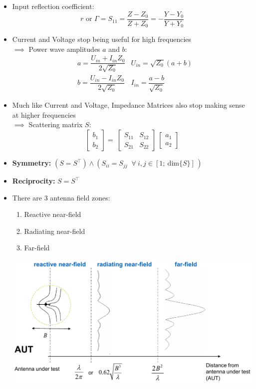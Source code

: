 \begin{itemize}
    \itemsep0pt
    \item Input reflection coefficient:\\
        \[r \text{ or } \Gamma = S_{11} = \dfrac{Z - Z_0}{Z + Z_0} = -\dfrac{Y - Y_0}{Y + Y_0}\]
    \item Current and Voltage stop being useful for high frequencies\\
        $\implies$ Power wave amplitudes $a$ and $b$:
    \begin{align*}
        &a = \dfrac{U_{in} + I_{in}Z_0}{2\sqrt{Z_0}} & U_{in} = \sqrt{Z_0} (a + b)\\
        &b = \dfrac{U_{in} - I_{in}Z_0}{2\sqrt{Z_0}} & I_{in} = \dfrac{a - b}{\sqrt{Z_0}}
    \end{align*}
    \item Much like Current and Voltage, Impedance Matrices also stop making sense at higher frequencies\\
    $\implies$ Scattering matrix $S$:
        \[\begin{bmatrix}b_1\\ b_2\end{bmatrix} =\
            \begin{bmatrix}S_{11} & S_{12}\\ S_{21} & S_{22}\end{bmatrix} \
            \begin{bmatrix}a_1\\ a_2\end{bmatrix}\]
            \item \textbf{Symmetry:} \(\left(S = S^\top\right) \land \left(S_{ii} = S_{jj}\;\;\forall\:i, j \in \left[1;\:\mathrm{dim}\{S\}\right]\,\right)\)
    \item \textbf{Reciprocity:} \(S = S^\top\)
    \item There are 3 antenna field zones:
        \begin{enumerate}
            \itemsep0pt
            \item Reactive near-field
            \item Radiating near-field
            \item Far-field
        \end{enumerate}
    \includegraphics[width=.4\paperheight]{content/aawp/pictures/antenna_field_zones.png}

\end{itemize}
